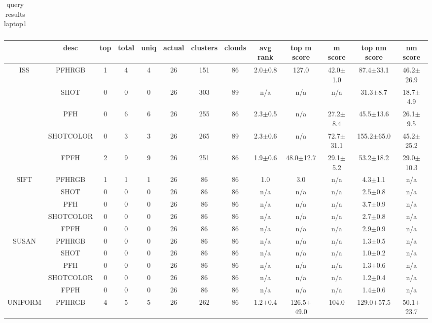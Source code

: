 \documentclass[11pt,a4paper]{kth-mag}
\begin{document}
\begin{landscape}
\begin{table}
\begin{tabular}{cc|ccccccccccc}
    \end{tabular}
    \caption{query results laptop1}
    \label{tab:qlaptop1}
  \end{table}
  \begin{table}
    \begin{tabular}{cc|ccccccccccc}
      & desc & top & total & uniq & actual & clusters & clouds & avg rank & top m score & m score & top nm score & nm score\\\hline
      \multirow{5}{*}{ISS} & PFHRGB & 1 & 4 & 4 & 26 & 151 & 86 & 2.0$\pm$0.8 & 127.0 & 42.0$\pm$1.0 & 87.4$\pm$33.1 & 46.2$\pm$26.9\\
      &SHOT & 0 & 0 & 0 & 26 & 303 & 89 & n/a & n/a & n/a & 31.3$\pm$8.7 & 18.7$\pm$4.9\\
      &PFH & 0 & 6 & 6 & 26 & 255 & 86 & 2.3$\pm$0.5 & n/a & 27.2$\pm$8.4 & 45.5$\pm$13.6 & 26.1$\pm$9.5\\
      &SHOTCOLOR & 0 & 3 & 3 & 26 & 265 & 89 & 2.3$\pm$0.6 & n/a & 72.7$\pm$31.1 & 155.2$\pm$65.0 & 45.2$\pm$25.2\\
      &FPFH & 2 & 9 & 9 & 26 & 251 & 86 & 1.9$\pm$0.6 & 48.0$\pm$12.7 & 29.1$\pm$5.2 & 53.2$\pm$18.2 & 29.0$\pm$10.3\\
      \hline\multirow{5}{*}{SIFT} & PFHRGB & 1 & 1 & 1 & 26 & 86 & 86 & 1.0 & 3.0 & n/a & 4.3$\pm$1.1 & n/a\\
      &SHOT & 0 & 0 & 0 & 26 & 86 & 86 & n/a & n/a & n/a & 2.5$\pm$0.8 & n/a\\
      &PFH & 0 & 0 & 0 & 26 & 86 & 86 & n/a & n/a & n/a & 3.7$\pm$0.9 & n/a\\
      &SHOTCOLOR & 0 & 0 & 0 & 26 & 86 & 86 & n/a & n/a & n/a & 2.7$\pm$0.8 & n/a\\
      &FPFH & 0 & 0 & 0 & 26 & 86 & 86 & n/a & n/a & n/a & 2.9$\pm$0.9 & n/a\\
      \hline\multirow{5}{*}{SUSAN} & PFHRGB & 0 & 0 & 0 & 26 & 86 & 86 & n/a & n/a & n/a & 1.3$\pm$0.5 & n/a\\
      &SHOT & 0 & 0 & 0 & 26 & 86 & 86 & n/a & n/a & n/a & 1.0$\pm$0.2 & n/a\\
      &PFH & 0 & 0 & 0 & 26 & 86 & 86 & n/a & n/a & n/a & 1.3$\pm$0.6 & n/a\\
      &SHOTCOLOR & 0 & 0 & 0 & 26 & 86 & 86 & n/a & n/a & n/a & 1.2$\pm$0.4 & n/a\\
      &FPFH & 0 & 0 & 0 & 26 & 86 & 86 & n/a & n/a & n/a & 1.4$\pm$0.6 & n/a\\
      \hline\multirow{5}{*}{UNIFORM} & PFHRGB & 4 & 5 & 5 & 26 & 262 & 86 & 1.2$\pm$0.4 & 126.5$\pm$49.0 & 104.0 & 129.0$\pm$57.5 & 50.1$\pm$23.7\\

\end{tabular}
\end{table}
\end{landscape}
\end{document}

